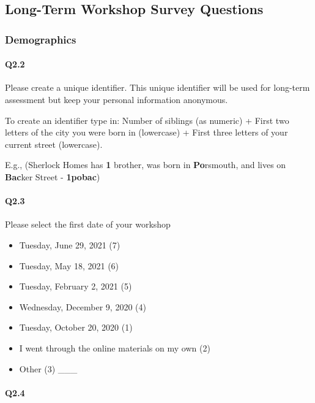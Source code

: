 \documentclass[030-workshop.tex]{subfiles}
\begin{document}
\subsection{Long-Term Workshop Survey Questions}
\label{sse:longtermworkshop-survey-questions}

\subsubsection{Demographics}

    \paragraph{Q2.2}

    Please create a unique identifier.
    This unique identifier will be used for long-term assessment but keep your personal information anonymous.

    To create an identifier type in:
    Number of siblings (as numeric) +
    First two letters of the city you were born in (lowercase) +
    First three letters of your current street (lowercase).

    E.g., (Sherlock Homes has \textbf{1} brother,
        was born in \textbf{Po}rsmouth,
        and lives on \textbf{Bac}ker Street - \textbf{1pobac})

    \paragraph{Q2.3}

    Please select the first date of your workshop

    \begin{itemize}
        \item Tuesday, June 29, 2021  (7)
        \item Tuesday, May 18, 2021  (6)
        \item Tuesday, February 2, 2021  (5)
        \item Wednesday, December 9, 2020  (4)
        \item Tuesday, October 20, 2020  (1)
        \item I went through the online materials on my own  (2)
        \item Other  (3) \_\_\_
    \end{itemize}

    \paragraph{Q2.4}
\end{document}
